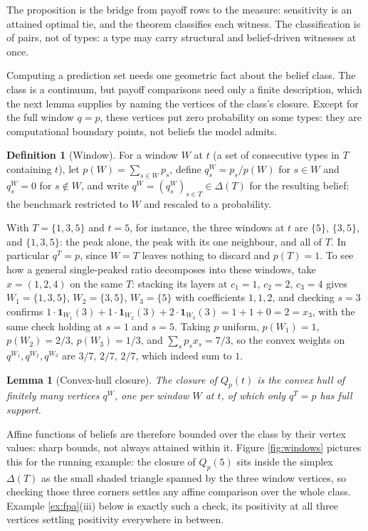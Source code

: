 \documentclass[12pt]{article}
\newtheorem{lemma}{Lemma}
\theoremstyle{definition}
\newtheorem{definition}{Definition}
\begin{document}
The proposition is the bridge from payoff rows to the measure: sensitivity is an attained optimal tie, and the theorem classifies each witness. The classification is of pairs, not of types: a type may carry structural and belief-driven witnesses at once.

Computing a prediction set needs one geometric fact about the belief class. The class is a continuum, but payoff comparisons need only a finite description, which the next lemma supplies by naming the vertices of the class's closure. Except for the full window $q = p$, these vertices put zero probability on some types: they are computational boundary points, not beliefs the model admits.

\begin{definition}[Window]\label{def:window}
For a window $W$ at $t$ (a set of consecutive types in $T$ containing $t$), let $p(W) = \sum_{s \in W} p_s$, define $q^W_s = p_s/p(W)$ for $s \in W$ and $q^W_s = 0$ for $s \notin W$, and write $q^W = (q^W_s)_{s \in T} \in \Delta(T)$ for the resulting belief: the benchmark restricted to $W$ and rescaled to a probability.
\end{definition}

With $T = \{1, 3, 5\}$ and $t = 5$, for instance, the three windows at $t$ are $\{5\}$, $\{3, 5\}$, and $\{1, 3, 5\}$: the peak alone, the peak with its one neighbour, and all of $T$. In particular $q^T = p$, since $W = T$ leaves nothing to discard and $p(T) = 1$. To see how a general single-peaked ratio decomposes into these windows, take $x = (1,2,4)$ on the same $T$: stacking its layers at $c_1=1$, $c_2=2$, $c_3=4$ gives $W_1=\{1,3,5\}$, $W_2=\{3,5\}$, $W_3=\{5\}$ with coefficients $1,1,2$, and checking $s=3$ confirms $1\cdot\mathbf{1}_{W_1}(3) + 1\cdot\mathbf{1}_{W_2}(3) + 2\cdot\mathbf{1}_{W_3}(3) = 1+1+0 = 2 = x_3$, with the same check holding at $s=1$ and $s=5$. Taking $p$ uniform, $p(W_1)=1$, $p(W_2)=2/3$, $p(W_3)=1/3$, and $\sum_s p_sx_s = 7/3$, so the convex weights on $q^{W_1}, q^{W_2}, q^{W_3}$ are $3/7$, $2/7$, $2/7$, which indeed sum to $1$.

\begin{lemma}[Convex-hull closure]\label{lem:windows}
The closure of $Q_p(t)$ is the convex hull of finitely many vertices $q^W$, one per window $W$ at $t$, of which only $q^T = p$ has full support.
\end{lemma}

Affine functions of beliefs are therefore bounded over the class by their vertex values: sharp bounds, not always attained within it. Figure \ref{fig:windows} pictures this for the running example: the closure of $Q_p(5)$ sits inside the simplex $\Delta(T)$ as the small shaded triangle spanned by the three window vertices, so checking those three corners settles any affine comparison over the whole class. Example \ref{ex:fpa}(iii) below is exactly such a check, its positivity at all three vertices settling positivity everywhere in between.
\end{document}
